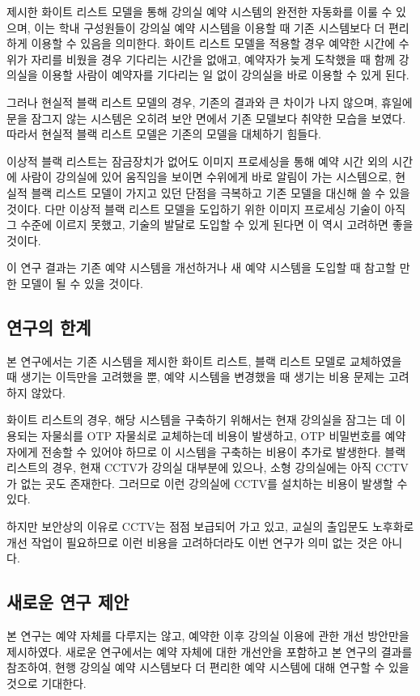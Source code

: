 \documentclass[11pt,a4paper]{article}
\begin{document}
제시한 화이트 리스트 모델을 통해 강의실 예약 시스템의 완전한 자동화를 이룰 수
있으며, 이는 학내 구성원들이 강의실 예약 시스템을 이용할 때 기존 시스템보다 더
편리하게 이용할 수 있음을 의미한다. 화이트 리스트 모델을 적용할 경우 예약한
시간에 수위가 자리를 비웠을 경우 기다리는 시간을 없애고, 예약자가 늦게 도착했을
때 함께 강의실을 이용할 사람이 예약자를 기다리는 일 없이 강의실을 바로 이용할
수 있게 된다.

그러나 현실적 블랙 리스트 모델의 경우, 기존의 결과와 큰 차이가 나지 않으며,
휴일에 문을 잠그지 않는 시스템은 오히려 보안 면에서 기존 모델보다 취약한 모습을
보였다. 따라서 현실적 블랙 리스트 모델은 기존의 모델을 대체하기 힘들다.

이상적 블랙 리스트는 잠금장치가 없어도 이미지 프로세싱을 통해 예약 시간 외의
시간에 사람이 강의실에 있어 움직임을 보이면 수위에게 바로 알림이 가는
시스템으로, 현실적 블랙 리스트 모델이 가지고 있던 단점을 극복하고 기존 모델을
대신해 쓸 수 있을 것이다. 다만 이상적 블랙 리스트 모델을 도입하기 위한 이미지
프로세싱 기술이 아직 그 수준에 이르지 못했고, 기술의 발달로 도입할 수 있게
된다면 이 역시 고려하면 좋을 것이다.

이 연구 결과는 기존 예약 시스템을 개선하거나 새 예약 시스템을 도입할 때 참고할
만한 모델이 될 수 있을 것이다.

\subsection{연구의 한계}
본 연구에서는 기존 시스템을 제시한 화이트 리스트, 블랙 리스트 모델로 교체하였을
때 생기는 이득만을 고려했을 뿐, 예약 시스템을 변경했을 때 생기는 비용 문제는
고려하지 않았다.

화이트 리스트의 경우, 해당 시스템을 구축하기 위해서는 현재 강의실을 잠그는 데
이용되는 자물쇠를 OTP 자물쇠로 교체하는데 비용이 발생하고, OTP 비밀번호를
예약자에게 전송할 수 있어야 하므로 이 시스템을 구축하는 비용이 추가로 발생한다.
블랙 리스트의 경우, 현재 CCTV가 강의실 대부분에 있으나, 소형 강의실에는 아직
CCTV가 없는 곳도 존재한다. 그러므로 이런 강의실에 CCTV를 설치하는 비용이 발생할
수 있다.

하지만 보안상의 이유로 CCTV는 점점 보급되어 가고 있고, 교실의 출입문도 노후화로
개선 작업이 필요하므로 이런 비용을 고려하더라도 이번 연구가 의미 없는 것은
아니다.

\subsection{새로운 연구 제안}
본 연구는 예약 자체를 다루지는 않고, 예약한 이후 강의실 이용에 관한 개선
방안만을 제시하였다. 새로운 연구에서는 예약 자체에 대한 개선안을 포함하고 본
연구의 결과를 참조하여, 현행 강의실 예약 시스템보다 더 편리한 예약 시스템에
대해 연구할 수 있을 것으로 기대한다.
\end{document}
